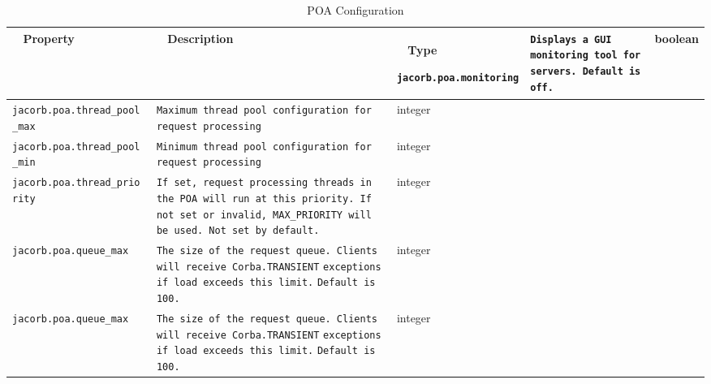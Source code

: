 \documentclass[12pt]{scrbook}
\begin{document}
\begin{small}
\begin{longtable}{|p{5cm}|p{9cm}|p{2cm}|}
\caption{POA Configuration}\\
\hline
~ \hfill \textbf {Property} \hfill ~ & ~ \hfill \textbf {Description} \hfill ~ & ~ \hfill \textbf {Type} \hfill ~ \endhead

\hline
\verb"jacorb.poa.monitoring" & \verb"Displays a GUI monitoring tool for"
\verb"servers. Default is off." & boolean \\
\hline
\verb"jacorb.poa.thread_pool"
\verb"_max" & \verb"Maximum thread pool configuration for"
\verb"request processing" & integer \\
\hline
\verb"jacorb.poa.thread_pool"
\verb"_min" & \verb"Minimum thread pool configuration for"
\verb"request processing" & integer \\
\hline
\verb"jacorb.poa.thread_prio"
\verb"rity" & \verb"If set, request processing threads in"
\verb"the POA will run at this priority. If"
\verb"not set or invalid, MAX_PRIORITY will"
\verb"be used. Not set by default." & integer \\
\hline
\verb"jacorb.poa.queue_max" & \verb"The size of the request queue. Clients"
\verb"will receive Corba.TRANSIENT"
\verb"exceptions if load exceeds this limit."
\verb"Default is 100." & integer \\
\hline
\verb"jacorb.poa.queue_max" & \verb"The size of the request queue. Clients"
\verb"will receive Corba.TRANSIENT"
\verb"exceptions if load exceeds this limit."
\verb"Default is 100." & integer \\
\hline

\end{longtable}
\end{small}
\end{document}
